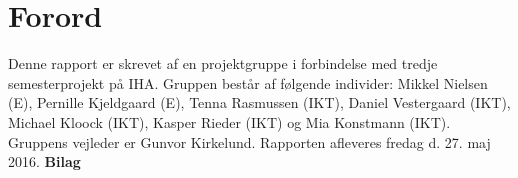 \chapter{Forord}
Denne rapport er skrevet af en projektgruppe i forbindelse med tredje semesterprojekt på IHA. Gruppen består af følgende individer: Mikkel Nielsen (E), Pernille Kjeldgaard (E), Tenna Rasmussen (IKT), Daniel Vestergaard (IKT), Michael Kloock (IKT), Kasper Rieder (IKT) og Mia Konstmann (IKT). Gruppens vejleder er Gunvor Kirkelund. Rapporten afleveres fredag d. 27. maj 2016. \noindent \textbf{Bilag} \newline